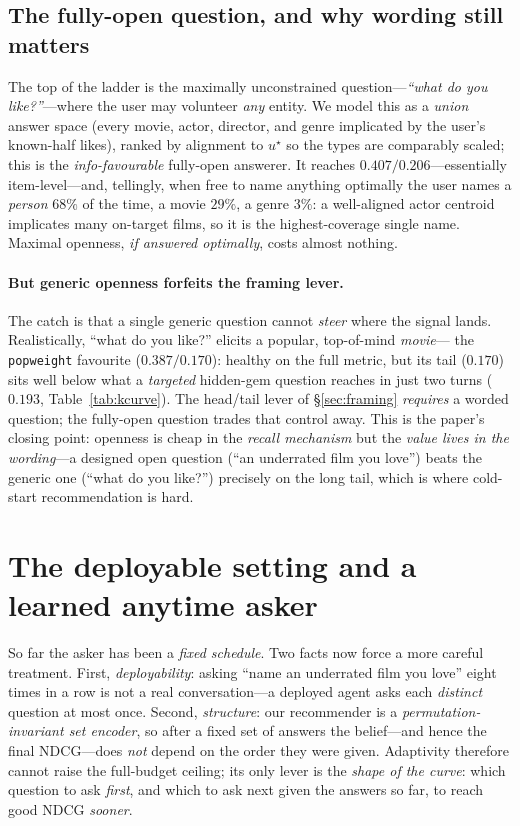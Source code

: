 \documentclass[11pt]{article}
\begin{document}
\subsection{The fully-open question, and why wording still matters}
\label{sec:fullyopen}
The top of the ladder is the maximally unconstrained question---\emph{``what do you like?''}---where the user may
volunteer \emph{any} entity. We model this as a \emph{union} answer space (every movie, actor, director, and genre
implicated by the user's known-half likes), ranked by alignment to $u^\star$ so the types are comparably scaled; this is
the \emph{info-favourable} fully-open answerer. It reaches $0.407/0.206$---essentially item-level---and, tellingly, when
free to name anything optimally the user names a \emph{person} $68\%$ of the time, a movie $29\%$, a genre $3\%$: a
well-aligned actor centroid implicates many on-target films, so it is the highest-coverage single name. Maximal openness,
\emph{if answered optimally}, costs almost nothing.

\paragraph{But generic openness forfeits the framing lever.} The catch is that a single generic question cannot
\emph{steer} where the signal lands. Realistically, ``what do you like?'' elicits a popular, top-of-mind \emph{movie}---
the \texttt{popweight} favourite ($0.387/0.170$): healthy on the full metric, but its tail ($0.170$) sits well below what
a \emph{targeted} hidden-gem question reaches in just two turns ($0.193$, Table~\ref{tab:kcurve}). The head/tail lever of
\S\ref{sec:framing} \emph{requires} a worded question; the fully-open question trades that control away. This is the
paper's closing point: openness is cheap in the \emph{recall mechanism} but the \emph{value lives in the wording}---a
designed open question (``an underrated film you love'') beats the generic one (``what do you like?'') precisely on the
long tail, which is where cold-start recommendation is hard.

\section{The deployable setting and a learned anytime asker}
\label{sec:learned}
So far the asker has been a \emph{fixed schedule}. Two facts now force a more careful treatment. First,
\emph{deployability}: asking ``name an underrated film you love'' eight times in a row is not a real conversation---a
deployed agent asks each \emph{distinct} question at most once. Second, \emph{structure}: our recommender is a
\emph{permutation-invariant set encoder}, so after a fixed set of answers the belief---and hence the final NDCG---does
\emph{not} depend on the order they were given. Adaptivity therefore cannot raise the full-budget ceiling; its only
lever is the \emph{shape of the curve}: which question to ask \emph{first}, and which to ask next given the answers so
far, to reach good NDCG \emph{sooner}.
\end{document}
